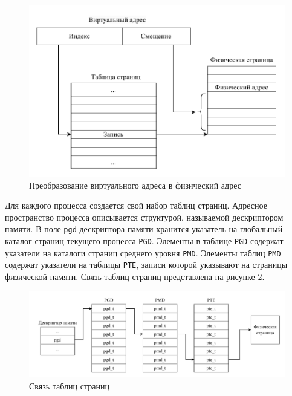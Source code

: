 \begin{figure}[H]
	\begin{center}
		\includegraphics[scale=0.7]{inc/img/address-translation.pdf}
	\end{center}
	\captionsetup{justification=centering}
	\caption{Преобразование виртуального адреса в физический адрес}
	\label{img:address-translation}
\end{figure}
    
Для каждого процесса создается свой набор таблиц страниц. Адресное пространство процесса описывается структурой, называемой дескриптором памяти. В поле \texttt{pgd} дескриптора памяти хранится указатель на глобальный каталог страниц текущего процесса \texttt{PGD}. Элементы в таблице \texttt{PGD} содержат указатели на каталоги страниц среднего уровня \texttt{PMD}. Элементы таблиц \texttt{PMD} содержат указатели на таблицы \texttt{PTE}, записи которой указывают на страницы физической памяти. Связь таблиц страниц представлена на рисунке \ref{img:page-tables}.

\begin{figure}[H]
	\begin{center}
		\includegraphics[scale=0.75]{inc/img/page-tables.pdf}
	\end{center}
	\captionsetup{justification=centering}
	\caption{Связь таблиц страниц}
	\label{img:page-tables}
\end{figure}

